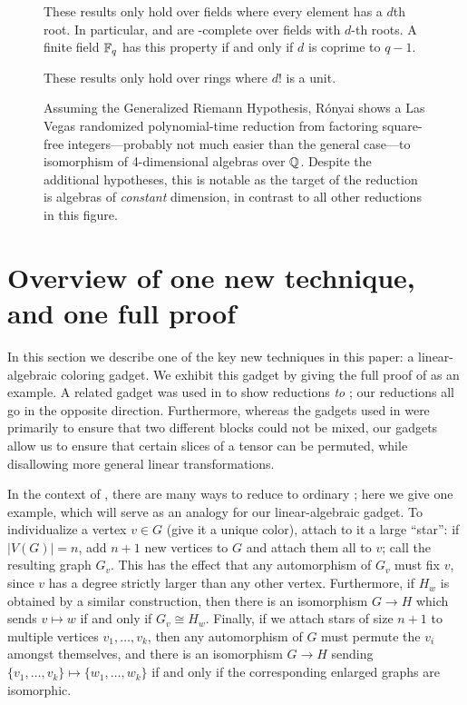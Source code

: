 \begin{figure}[!htbp]
{\hrulefill

 These results only hold over fields where every element has a $d$th root. In particular, 
 and  are \ThreeTI-complete over fields with $d$-th roots. 
A finite field $\mathbb{F}_q$ has this property if and only if $d$ is coprime to 
$q-1$. 

 These results only hold over rings where $d!$ is a unit.

Assuming the Generalized Riemann Hypothesis, R\'{o}nyai \cite{Ronyai88} shows a Las Vegas randomized polynomial-time reduction from factoring square-free integers---probably not much easier than the general case---to isomorphism of 4-dimensional algebras over $\mathbb{Q}$. Despite the additional hypotheses, this is notable as the target of the reduction is algebras of \emph{constant} dimension, in contrast to all other reductions in this figure.
 }
\end{figure}

\section{Overview of one new technique, and one full proof}\label{sec:technique}

In this section we describe one of the key new
techniques in this paper: a linear-algebraic 
coloring gadget. We exhibit this gadget by giving the full proof of 
 as an example. A related gadget was used in 
\cite{FGS19} to show reductions \emph{to} \ThreeTI; our reductions all go in the 
opposite direction. Furthermore, whereas the gadgets used in \cite{FGS19} were 
primarily to ensure that two different blocks could not be mixed, our gadgets 
allow us to ensure that certain slices of a tensor can be permuted, while 
disallowing more general linear transformations. 

In the context of \GI, there are many ways to reduce  to ordinary \GI; here we give one example, which will serve as an analogy for our linear-algebraic gadget. To individualize a vertex $v \in G$ (give it a unique color), attach to it a large ``star'': if $|V(G)|=n$, add $n+1$ new vertices to $G$ and attach them all to $v$; call the resulting graph $G_v$. This has the effect that any automorphism of $G_v$ must fix $v$, since $v$ has a degree strictly larger than any other vertex. Furthermore, if $H_w$ is obtained by a similar construction, then there is an isomorphism $G \to H$ which sends $v \mapsto w$ if and only if $G_v \cong H_w$. Finally, if we attach stars of size $n+1$ to multiple vertices $v_1, \dotsc, v_k$, then any automorphism of $G$ must permute the $v_i$ amongst themselves, and there is an isomorphism $G \to H$ sending $\{v_1, \dotsc, v_k\} \mapsto \{w_1, \dotsc, w_k \}$ if and only if the corresponding enlarged graphs are isomorphic.

